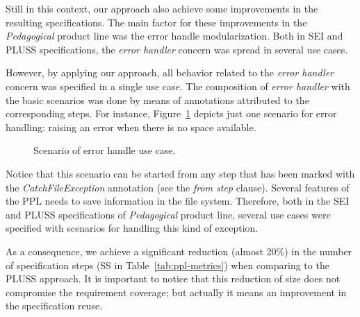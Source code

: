 \documentclass{acm_proc_article-sp}
\begin{document}
{Still in this context, our approach also achieve some improvements in the resulting specifications. The main factor for these improvements in the \emph{Pedagogical} product line was the error handle modularization. Both in SEI and PLUSS specifications, the \emph{error handler} concern was spread in several use cases.    

However, by applying our approach, all behavior related to the \emph{error handler} concern was specified in a single use case. The composition of \emph{error handler} with the basic scenarios was done by means of annotations attributed to the corresponding steps. For instance, Figure~\ref{fig:error-handle} depicts just one scenario for error handling: raising  an error when there is no space available. 

\begin{figure}[h]
\caption{Scenario of error handle use case.}
\label{fig:error-handle}
\end{figure}
    
Notice that this scenario can be started from any step that has been marked with the \emph{CatchFileException} annotation (see the \emph{from step} clause). Several features of the PPL needs to save information in the file system. Therefore, both in the SEI and PLUSS specifications of \emph{Pedagogical} product line, several use cases were specified with scenarios for handling this kind of exception.


As a consequence, we achieve a significant reduction (almost 20\%) in the number of specification steps (SS in Table~\ref{tab:ppl-metrics}) when comparing to the PLUSS approach. It is important to notice that this reduction of size does not compromise the requirement coverage; but actually it means an improvement in the specification reuse.



}
\end{document}
